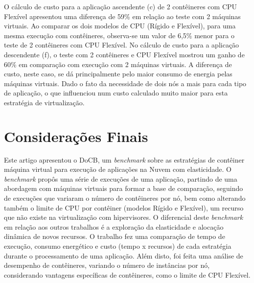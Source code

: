 \documentclass[twoside,english,brazilian]{UNISINOSartigo}
\begin{document}
O cálculo de custo para a aplicação ascendente (c) de 2 contêineres com CPU Flexível apresentou uma diferença de 59\% em relação ao teste com 2 máquinas virtuais. Ao comparar os dois modelos de CPU (Rígido e Flexível), para uma mesma execução com contêineres, observa-se um valor de 6,5\% menor para o teste de 2 contêineres com CPU Flexível. No cálculo de custo para a aplicação descendente (f), o teste com 2 contêineres e CPU Flexível mostrou um ganho de 60\% em comparação com execução com 2 máquinas virtuais. A diferença de custo, neste caso, se dá principalmente pelo maior consumo de energia pelas máquinas virtuais. Dado o fato da necessidade de dois nós a mais para cada tipo de aplicação, o que influenciou num custo calculado muito maior para esta estratégia de virtualização.

\section{Considerações Finais}
\label{conclusion}

Este artigo apresentou o DoCB, um \textit{benchmark} sobre as estratégias de contêiner máquina virtual para execução de aplicações na Nuvem com elasticidade. O \textit{benchmark} propôs uma série de execuções de uma aplicação, partindo de uma abordagem com máquinas virtuais para formar a base de comparação, seguindo de execuções que variaram o número de contêineres por nó, bem como alterando também o limite de CPU por contêiner (modelos Rígido e Flexível), um recurso que não existe na virtualização com hipervisores. O diferencial deste \textit{benchmark} em relação aos outros trabalhos é a exploração da elasticidade e alocação dinâmica de novos recursos. O trabalho fez uma comparação de tempo de execução, consumo energético e custo (tempo x recursos) de cada estratégia durante o processamento de uma aplicação. Além disto, foi feita uma análise de desempenho de contêineres, variando o número de instâncias por nó, considerando vantagens específicas de contêineres, como o limite de CPU Flexível. 
\end{document}
